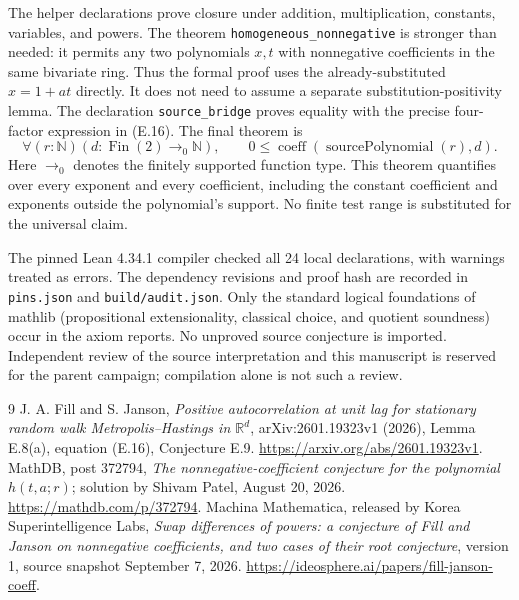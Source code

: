 \documentclass[11pt]{article}
\newcommand{\NN}{\mathbb N}
\begin{document}
The helper declarations prove closure under addition, multiplication, constants, variables, and powers. The theorem \texttt{homogeneous\_nonnegative} is stronger than needed: it permits any two polynomials $x,t$ with nonnegative coefficients in the same bivariate ring. Thus the formal proof uses the already-substituted $x=1+at$ directly. It does not need to assume a separate substitution-positivity lemma. The declaration \texttt{source\_bridge} proves equality with the precise four-factor expression in (E.16). The final theorem is
\[
\forall(r:\NN)(d:\operatorname{Fin}(2)\to_0\NN),\qquad
0\leq\operatorname{coeff}(\operatorname{sourcePolynomial}(r),d).
\]
Here $\to_0$ denotes the finitely supported function type. This theorem quantifies over every exponent and every coefficient, including the constant coefficient and exponents outside the polynomial's support. No finite test range is substituted for the universal claim.

The pinned Lean 4.34.1 compiler checked all 24 local declarations, with warnings treated as errors. The dependency revisions and proof hash are recorded in \texttt{pins.json} and \texttt{build/audit.json}. Only the standard logical foundations of mathlib (propositional extensionality, classical choice, and quotient soundness) occur in the axiom reports. No unproved source conjecture is imported. Independent review of the source interpretation and this manuscript is reserved for the parent campaign; compilation alone is not such a review.

\begin{thebibliography}{9}
 J. A. Fill and S. Janson, \emph{Positive autocorrelation at unit lag for stationary random walk Metropolis--Hastings in $\mathbb R^d$}, arXiv:2601.19323v1 (2026), Lemma E.8(a), equation (E.16), Conjecture E.9. \url{https://arxiv.org/abs/2601.19323v1}.
 MathDB, post 372794, \emph{The nonnegative-coefficient conjecture for the polynomial $h(t,a;r)$}; solution by Shivam Patel, August 20, 2026. \url{https://mathdb.com/p/372794}.
 Machina Mathematica, released by Korea Superintelligence Labs, \emph{Swap differences of powers: a conjecture of Fill and Janson on nonnegative coefficients, and two cases of their root conjecture}, version 1, source snapshot September 7, 2026. \url{https://ideosphere.ai/papers/fill-janson-coeff}.
\end{thebibliography}
\end{document}
